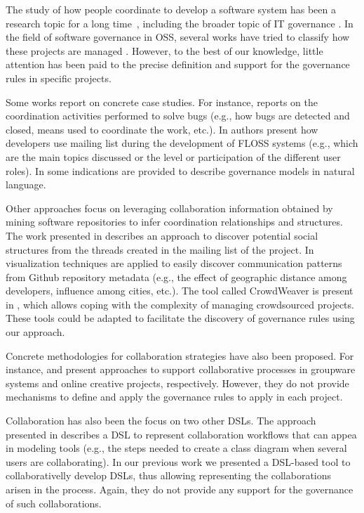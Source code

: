 The study of how people coordinate to develop a software system has been a research topic for a long time~\cite{Herbsleb1999,Kraut1995,Parnas1972,Crowston2005,Markus2007}, including the broader topic of IT governance \cite{Chulani2008,Ramasubbu2008,sg,Webb2006}. In the field of software governance in OSS, several works have tried to classify how these projects are managed \cite{Laat2007,Markus2007,DeNoni2013}. However, to the best of our knowledge, little attention has been paid to the precise definition and support for the governance rules in specific projects.

Some works report on concrete case studies. For instance, \cite{Aranda2009} reports on the coordination activities performed to solve bugs (e.g., how bugs are detected and closed, means used to coordinate the work, etc.). In \cite{Guzzi2013} authors present how developers use mailing list during the development of FLOSS systems (e.g., which are the main topics discussed or the level or participation of the different user roles). In \cite{osswatch} some indications are provided to describe governance models in natural language.

Other approaches focus on leveraging collaboration information obtained by mining software repositories to infer coordination relationships and structures.  The work presented in \cite{Bird2008} describes an approach to discover potential social structures from the threads created in the mailing list of the project. In \cite{Heller2011} visualization techniques are applied to easily discover communication patterns from Github repository metadata (e.g., the effect of geographic distance among developers, influence among cities, etc.). The tool called CrowdWeaver is present in \cite{Kittur2012}, which allows coping with the complexity of managing crowdsourced projects. These tools could be adapted to facilitate the discovery of governance rules using our approach.

Concrete methodologies for collaboration strategies have also been proposed. For instance, \cite{Duque2012} and \cite{Luther2013} present approaches to support collaborative processes in groupware systems and online creative projects, respectively. However, they do not provide mechanisms to define and apply the governance rules to apply in each project.

Collaboration has also been the focus on two other DSLs. The approach presented in \cite{Gallardo2012} describes a DSL to represent collaboration workflows that can appea in modeling tools (e.g., the steps needed to create a class diagram when several users are collaborating). In our previous work \cite{bib:collaboro} we presented a DSL-based tool to collaborativelly develop DSLs, thus allowing representing the collaborations arisen in the process. Again, they do not provide any support for the governance of such collaborations.

